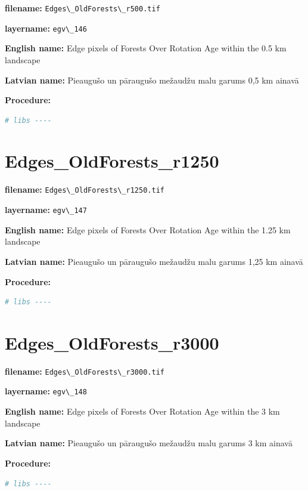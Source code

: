 \documentclass[
]{book}
\newcommand{\passthrough}[1]{#1}
\begin{document}
\textbf{filename:} \passthrough{\lstinline!Edges\_OldForests\_r500.tif!}

\textbf{layername:} \passthrough{\lstinline!egv\_146!}

\textbf{English name:} Edge pixels of Forests Over Rotation Age within the 0.5 km landscape

\textbf{Latvian name:} Pieaugušo un pāraugušo mežaudžu malu garums 0,5 km ainavā

\textbf{Procedure:}

\begin{lstlisting}[language=R]
# libs ----
\end{lstlisting}

\section{Edges\_OldForests\_r1250}\label{ch06.147}

\textbf{filename:} \passthrough{\lstinline!Edges\_OldForests\_r1250.tif!}

\textbf{layername:} \passthrough{\lstinline!egv\_147!}

\textbf{English name:} Edge pixels of Forests Over Rotation Age within the 1.25 km landscape

\textbf{Latvian name:} Pieaugušo un pāraugušo mežaudžu malu garums 1,25 km ainavā

\textbf{Procedure:}

\begin{lstlisting}[language=R]
# libs ----
\end{lstlisting}

\section{Edges\_OldForests\_r3000}\label{ch06.148}

\textbf{filename:} \passthrough{\lstinline!Edges\_OldForests\_r3000.tif!}

\textbf{layername:} \passthrough{\lstinline!egv\_148!}

\textbf{English name:} Edge pixels of Forests Over Rotation Age within the 3 km landscape

\textbf{Latvian name:} Pieaugušo un pāraugušo mežaudžu malu garums 3 km ainavā

\textbf{Procedure:}

\begin{lstlisting}[language=R]
# libs ----
\end{lstlisting}
\end{document}

